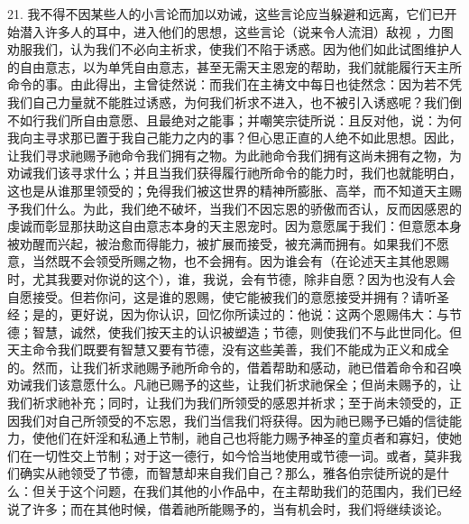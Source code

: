 21. 我不得不因某些人的小言论而加以劝诫，这些言论应当躲避和远离，它们已开始潜入许多人的耳中，进入他们的思想，这些言论（说来令人流泪）敌视 ，力图劝服我们，认为我们不必向主祈求，使我们不陷于诱惑。因为他们如此试图维护人的自由意志，以为单凭自由意志，甚至无需天主恩宠的帮助，我们就能履行天主所命令的事。由此得出，主曾徒然说：而我们在主祷文中每日也徒然念：因为若不凭我们自己力量就不能胜过诱惑，为何我们祈求不进入，也不被引入诱惑呢？我们倒不如行我们所自由意愿、且最绝对之能事；并嘲笑宗徒所说：且反对他，说：为何我向主寻求那已置于我自己能力之内的事？但心思正直的人绝不如此思想。因此，让我们寻求祂赐予祂命令我们拥有之物。为此祂命令我们拥有这尚未拥有之物，为劝诫我们该寻求什么；并且当我们获得履行祂所命令的能力时，我们也就能明白，这也是从谁那里领受的；免得我们被这世界的精神所膨胀、高举，而不知道天主赐予我们什么。为此，我们绝不破坏，当我们不因忘恩的骄傲而否认，反而因感恩的虔诚而彰显那扶助这自由意志本身的天主恩宠时。因为意愿属于我们：但意愿本身被劝醒而兴起，被治愈而得能力，被扩展而接受，被充满而拥有。如果我们不愿意，当然既不会领受所赐之物，也不会拥有。因为谁会有（在论述天主其他恩赐时，尤其我要对你说的这个），谁，我说，会有节德，除非自愿？因为也没有人会自愿接受。但若你问，这是谁的恩赐，使它能被我们的意愿接受并拥有？请听圣经；是的，更好说，因为你认识，回忆你所读过的：他说：这两个恩赐伟大：与节德；智慧，诚然，使我们按天主的认识被塑造；节德，则使我们不与此世同化。但天主命令我们既要有智慧又要有节德，没有这些美善，我们不能成为正义和成全的。然而，让我们祈求祂赐予祂所命令的，借着帮助和感动，祂已借着命令和召唤劝诫我们该意愿什么。凡祂已赐予的这些，让我们祈求祂保全；但尚未赐予的，让我们祈求祂补充；同时，让我们为我们所领受的感恩并祈求；至于尚未领受的，正因我们对自己所领受的不忘恩，我们当信我们将获得。因为祂已赐予已婚的信徒能力，使他们在奸淫和私通上节制，祂自己也将能力赐予神圣的童贞者和寡妇，使她们在一切性交上节制；对于这一德行，如今恰当地使用或节德一词。或者，莫非我们确实从祂领受了节德，而智慧却来自我们自己？那么，雅各伯宗徒所说的是什么：但关于这个问题，在我们其他的小作品中，在主帮助我们的范围内，我们已经说了许多；而在其他时候，借着祂所能赐予的，当有机会时，我们将继续谈论。\par

